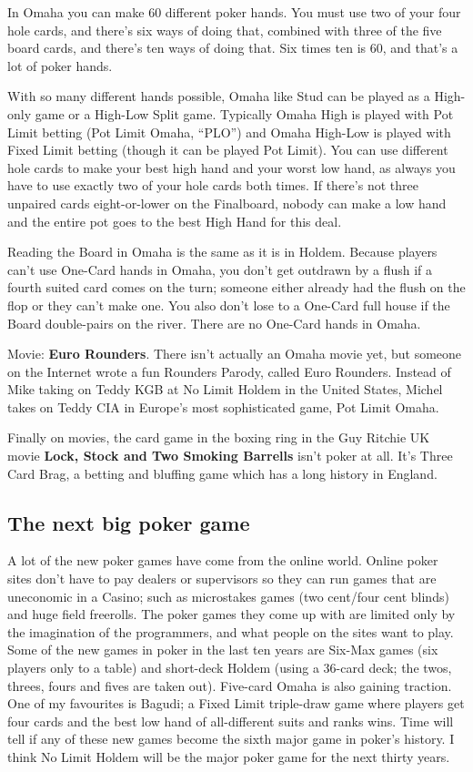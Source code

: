 In Omaha you can make 60 different poker hands. You must use two of
your four hole cards, and there's six ways of doing that, combined
with three of the five board cards, and there's ten ways of doing
that. Six times ten is 60, and that's a lot of poker hands.

With so many different hands possible, Omaha like Stud can be played
as a High-only game or a High-Low Split game. Typically Omaha High is
played with Pot Limit betting (Pot Limit Omaha, ``PLO'') and Omaha
High-Low is played with Fixed Limit betting (though it can be played
Pot Limit). You can use different hole cards to make your best high
hand and your worst low hand, as always you have to use exactly two of
your hole cards both times. If there's not three unpaired cards
eight-or-lower on the Finalboard, nobody can make a low hand and the
entire pot goes to the best High Hand for this deal.

Reading the Board in Omaha is the same as it is in Holdem. Because
players can't use One-Card hands in Omaha, you don't get outdrawn
by a flush if a fourth suited card comes on the turn; someone either
already had the flush on the flop or they can't make one. You also
don't lose to a One-Card full house if the Board double-pairs on
the river. There are no One-Card hands in Omaha.

Movie: \textbf{Euro Rounders}. There isn't actually an Omaha movie
yet, but someone on the Internet wrote a fun Rounders Parody, called
Euro Rounders. Instead of Mike taking on Teddy KGB at No Limit Holdem
in the United States, Michel takes on Teddy CIA in Europe's most
sophisticated game, Pot Limit Omaha.

Finally on movies, the card game in the boxing ring in the Guy Ritchie
UK movie \textbf{Lock, Stock and Two Smoking Barrells} isn't poker at
all. It's Three Card Brag, a betting and bluffing game which has a
long history in England.

\subsection{The next big poker game}

A lot of the new poker games have come from the online world. Online
poker sites don't have to pay dealers or supervisors so they can run
games that are uneconomic in a Casino; such as microstakes games (two
cent/four cent blinds) and huge field freerolls. The poker games they
come up with are limited only by the imagination of the programmers,
and what people on the sites want to play. Some of the new games
in poker in the last ten years are Six-Max games (six players only to
a table) and short-deck Holdem (using a 36-card deck; the twos,
threes, fours and fives are taken out). Five-card Omaha is also
gaining traction. One of my favourites is Bagudi; a Fixed Limit
triple-draw game where players get four cards and the best low hand of
all-different suits and ranks wins. Time will tell if any of these new
games become the sixth major game in poker's history. I think No Limit
Holdem will be the major poker game for the next thirty years.

